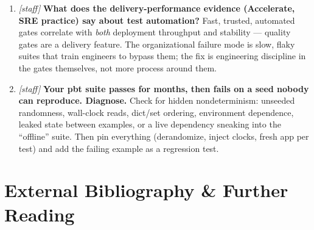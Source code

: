 \begin{enumerate}[label=\textbf{Q\arabic*.}, leftmargin=1.7cm]
        CI step; run gates advisory-first for a month, publish the
        catch statistics, then make them blocking; invest in
        provider-state libraries per domain; measure pact coverage of
        production traffic, not of repositories.
  \item \emph{[staff]} \textbf{What does the delivery-performance evidence
        (Accelerate, SRE practice) say about test automation?} Fast,
        trusted, automated gates correlate with \emph{both} deployment
        throughput and stability --- quality gates are a delivery feature.
        The organizational failure mode is slow, flaky suites that train
        engineers to bypass them; the fix is engineering discipline in the
        gates themselves, not more process around them.
  \item \emph{[staff]} \textbf{Your pbt suite passes for months, then
        fails on a seed nobody can reproduce. Diagnose.} Check for hidden
        nondeterminism: unseeded randomness, wall-clock reads, dict/set
        ordering, environment dependence, leaked state between examples,
        or a live dependency sneaking into the ``offline'' suite. Then
        pin everything (derandomize, inject clocks, fresh app per test)
        and add the failing example as a regression test.
\end{enumerate}

\section{External Bibliography \& Further Reading}
\label{sec:ch19-bibliography}

